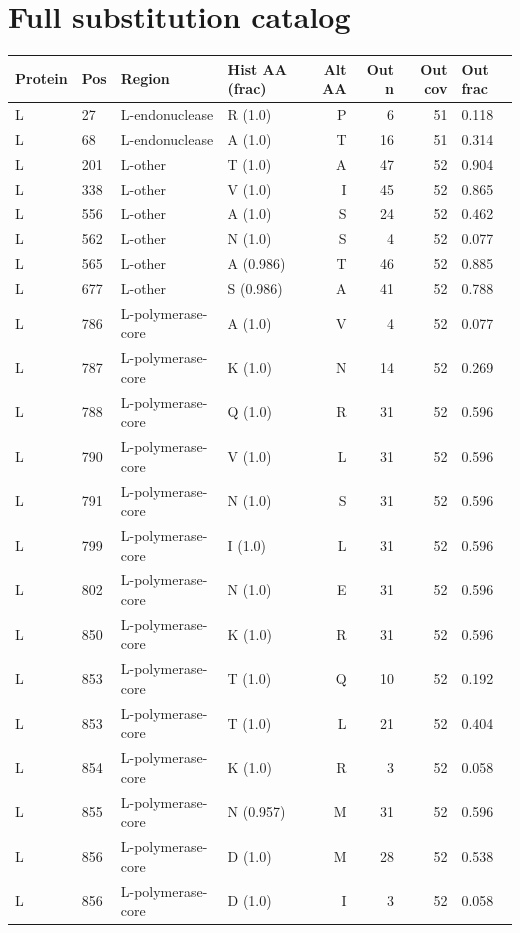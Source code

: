 \documentclass[12pt]{article}
\begin{document}
\section{Full substitution catalog}
\small
\begin{longtable}{llllrrrl}
\hline
Protein & Pos & Region & Hist AA (frac) & Alt AA & Out n & Out cov & Out frac \\
\hline
\endhead
L & 27 & L-endonuclease & R (1.0) & P & 6 & 51 & 0.118 \\
L & 68 & L-endonuclease & A (1.0) & T & 16 & 51 & 0.314 \\
L & 201 & L-other & T (1.0) & A & 47 & 52 & 0.904 \\
L & 338 & L-other & V (1.0) & I & 45 & 52 & 0.865 \\
L & 556 & L-other & A (1.0) & S & 24 & 52 & 0.462 \\
L & 562 & L-other & N (1.0) & S & 4 & 52 & 0.077 \\
L & 565 & L-other & A (0.986) & T & 46 & 52 & 0.885 \\
L & 677 & L-other & S (0.986) & A & 41 & 52 & 0.788 \\
L & 786 & L-polymerase-core & A (1.0) & V & 4 & 52 & 0.077 \\
L & 787 & L-polymerase-core & K (1.0) & N & 14 & 52 & 0.269 \\
L & 788 & L-polymerase-core & Q (1.0) & R & 31 & 52 & 0.596 \\
L & 790 & L-polymerase-core & V (1.0) & L & 31 & 52 & 0.596 \\
L & 791 & L-polymerase-core & N (1.0) & S & 31 & 52 & 0.596 \\
L & 799 & L-polymerase-core & I (1.0) & L & 31 & 52 & 0.596 \\
L & 802 & L-polymerase-core & N (1.0) & E & 31 & 52 & 0.596 \\
L & 850 & L-polymerase-core & K (1.0) & R & 31 & 52 & 0.596 \\
L & 853 & L-polymerase-core & T (1.0) & Q & 10 & 52 & 0.192 \\
L & 853 & L-polymerase-core & T (1.0) & L & 21 & 52 & 0.404 \\
L & 854 & L-polymerase-core & K (1.0) & R & 3 & 52 & 0.058 \\
L & 855 & L-polymerase-core & N (0.957) & M & 31 & 52 & 0.596 \\
L & 856 & L-polymerase-core & D (1.0) & M & 28 & 52 & 0.538 \\
L & 856 & L-polymerase-core & D (1.0) & I & 3 & 52 & 0.058 \\

\end{longtable}
\end{document}
